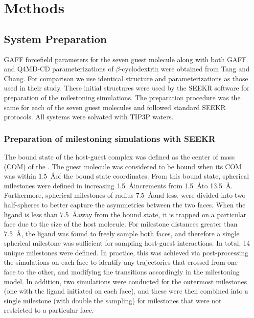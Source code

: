 
\section*{Methods}
\subsection*{System Preparation} 
\par GAFF\cite{Wang2004,Wang2006} forcefield parameters for the seven guest molecule
along with both GAFF and Q4MD-CD\cite{Cezard2011} parameterizations of $\beta$-cyclodextrin 
were obtained from Tang and Chang\cite{Tang2017}. For comparison we use identical structure and
parameterizations as those used in their study. These initial structures were 
used by the SEEKR software for preparation of the milestoning simulations. 
The preparation procedure was the same for each of the seven guest molecules and 
followed standard SEEKR protocols\cite{Votapka2017}. All systems were solvated 
with TIP3P waters\cite{Jorgensen1983a}.

\subsubsection*{Preparation of milestoning simulations with SEEKR} 
\par The bound state of the host-guest complex was defined as the center of mass (COM) 
of the \bcd. The guest molecule was considered to be bound when 
its COM was within 1.5~\AA of the bound state coordinates. From this bound state, 
spherical milestones were defined in increasing 1.5~\AA increments from 1.5~\AA to
13.5~\AA. Furthermore, spherical milestones of radius 7.5~\AA and less, were 
divided into two half-spheres to better capture the asymmetries between the two faces. 
When the ligand is less than 7.5~\AA away from the bound state, it is trapped on 
a particular face due to the size of the host molecule. For milestone distances 
greater than 7.5~\AA, the ligand was found to freely sample both faces, and therefore 
a single spherical milestone was sufficient for sampling host-guest interactions. 
In total, 14 unique milestones were defined. In practice, this was achieved via 
post-processing the simulations on each face to identify any trajectories that 
crossed from one face to the other, and modifying the transitions accordingly in 
the milestoning model. In addition, two simulations were conducted for the outermost 
milestones (one with the ligand initiated on each face), and these were then 
combined into a single milestone (with double the sampling) for milestones that 
were not restricted to a particular face.


